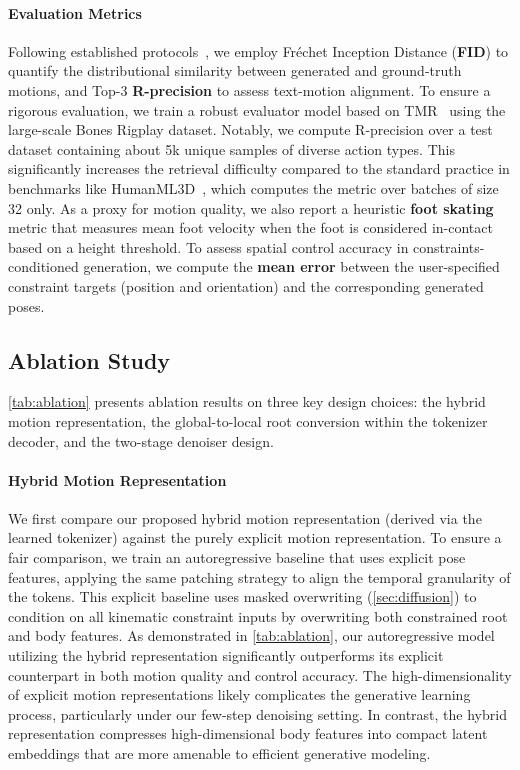 \paragraph{Evaluation Metrics}
Following established protocols~\cite{guo2022humanml3d}, we employ Fréchet Inception Distance (\textbf{FID}) to quantify the distributional similarity between generated and ground-truth motions, and Top-3 \textbf{R-precision} to assess text-motion alignment. To ensure a rigorous evaluation, we train a robust evaluator model based on TMR~\cite{petrovich23tmr} using the large-scale Bones Rigplay dataset. Notably, we compute R-precision over a test dataset containing about 5k unique samples of diverse action types. This significantly increases the retrieval difficulty compared to the standard practice in benchmarks like HumanML3D~\cite{guo2022humanml3d}, which computes the metric over batches of size 32 only. As a proxy for motion quality, we also report a heuristic \textbf{foot skating} metric that measures mean foot velocity when the foot is considered in-contact based on a height threshold. To assess spatial control accuracy in constraints-conditioned generation, we compute the \textbf{mean error} between the user-specified constraint targets (position and orientation) and the corresponding generated poses.





\subsection{Ablation Study}
\label{sec:results_ablation}

\cref{tab:ablation} presents ablation results on three key design choices: the hybrid motion representation, the global-to-local root conversion within the tokenizer decoder, and the two-stage denoiser design.

\paragraph{Hybrid Motion Representation}
We first compare our proposed hybrid motion representation (derived via the learned tokenizer) against the purely explicit motion representation. To ensure a fair comparison, we train an autoregressive baseline that uses explicit pose features, applying the same patching strategy to align the temporal granularity of the tokens. This explicit baseline uses masked overwriting (\cref{sec:diffusion}) to condition on all kinematic constraint inputs by overwriting both constrained root and body features.
As demonstrated in \cref{tab:ablation}, our autoregressive model utilizing the hybrid representation significantly outperforms its explicit counterpart in both motion quality and control accuracy. 
The high-dimensionality of explicit motion representations likely complicates the generative learning process, particularly under our few-step denoising setting. In contrast, the hybrid representation compresses high-dimensional body features into compact latent embeddings that are more amenable to efficient generative modeling.

